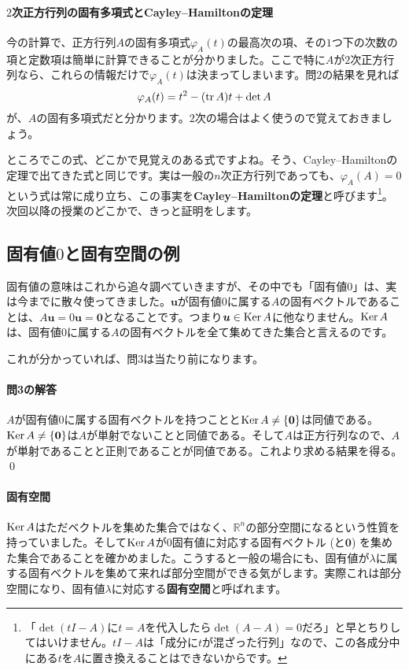 \paragraph{$2$次正方行列の固有多項式とCayley--Hamiltonの定理}

今の計算で、正方行列$A$の固有多項式$\varphi_A(t)$の最高次の項、その$1$つ下の次数の項と定数項は簡単に計算できることが分かりました。ここで特に$A$が$2$次正方行列なら、これらの情報だけで$\varphi_A(t)$は決まってしまいます。問$2$の結果を見れば
\[
\varphi_A(t) = t^2 - (\operatorname{tr} A)t + \det A
\]
が、$A$の固有多項式だと分かります。$2$次の場合はよく使うので覚えておきましょう。

ところでこの式、どこかで見覚えのある式ですよね。そう、Cayley--Hamiltonの定理で出てきた式と同じです。実は一般の$n$次正方行列であっても、$\varphi_A(A) = 0$という式は常に成り立ち、この事実を\textbf{Cayley--Hamiltonの定理}と呼びます\footnote{「$\det(tI - A)$に$t = A$を代入したら$\det(A - A) = 0$だろ」と早とちりしてはいけません。$tI - A$は「成分に$t$が混ざった行列」なので、この各成分中にある$t$を$A$に置き換えることはできないからです。}。次回以降の授業のどこかで、きっと証明をします。

\subsection{固有値$0$と固有空間の例}

固有値の意味はこれから追々調べていきますが、その中でも「固有値$0$」は、実は今までに散々使ってきました。$\bm{u}$が固有値$0$に属する$A$の固有ベクトルであることは、$A\bm{u} = 0\bm{u} = \bm{0}$となることです。つまり$\boldsymbol{u} \in \operatorname{Ker} A$に他なりません。$\operatorname{Ker} A$は、固有値$0$に属する$A$の固有ベクトルを全て集めてきた集合と言えるのです。

これが分かっていれば、問$3$は当たり前になります。

\paragraph{問3の解答} $A$が固有値$0$に属する固有ベクトルを持つことと$\operatorname{Ker} A \neq \{\boldsymbol{0}\}$は同値である。$\operatorname{Ker} A \neq \{\boldsymbol{0}\}$は$A$が単射でないことと同値である。そして$A$は正方行列なので、$A$が単射であることと正則であることが同値である。これより求める結果を得る。 \qed

\paragraph{固有空間}

$\operatorname{Ker} A$はただベクトルを集めた集合ではなく、$\mathbb{R}^n$の部分空間になるという性質を持っていました。そして$\operatorname{Ker} A$が$0$固有値に対応する固有ベクトル (と$\bm{0}$) を集めた集合であることを確かめました。こうすると一般の場合にも、固有値が$\lambda$に属する固有ベクトルを集めて来れば部分空間ができる気がします。実際これは部分空間になり、固有値$\lambda$に対応する\textbf{固有空間}と呼ばれます。

